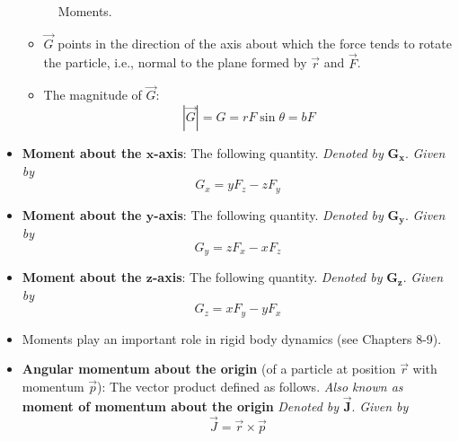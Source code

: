\documentclass[../notes.tex]{subfiles}
\begin{document}
\begin{itemize}
\begin{figure}[h!]
        \caption{Moments.}
        \label{fig:moments}
    \end{figure}
    \begin{itemize}
        \item $\vec{G}$ points in the direction of the axis about which the force tends to rotate the particle, i.e., normal to the plane formed by $\vec{r}$ and $\vec{F}$.
        \item The magnitude of $\vec{G}$:
        \begin{equation*}
            |\vec{G}| = G
            = rF\sin\theta
            = bF
        \end{equation*}
    \end{itemize}
    \item \textbf{Moment about the $\bm{x}$-axis}: The following quantity. \emph{Denoted by} $\bm{G_x}$. \emph{Given by}
    \begin{equation*}
        G_x = yF_z-zF_y
    \end{equation*}
    \item \textbf{Moment about the $\bm{y}$-axis}: The following quantity. \emph{Denoted by} $\bm{G_y}$. \emph{Given by}
    \begin{equation*}
        G_y = zF_x-xF_z
    \end{equation*}
    \item \textbf{Moment about the $\bm{z}$-axis}: The following quantity. \emph{Denoted by} $\bm{G_z}$. \emph{Given by}
    \begin{equation*}
        G_z = xF_y-yF_x
    \end{equation*}
    \item Moments play an important role in rigid body dynamics (see Chapters 8-9).
    \item \textbf{Angular momentum about the origin} (of a particle at position $\vec{r}$ with momentum $\vec{p}$): The vector product defined as follows. \emph{Also known as} \textbf{moment of momentum about the origin} \emph{Denoted by} $\bm{\vec{J}}$. \emph{Given by}
    \begin{equation*}
        \vec{J} = \vec{r}\times\vec{p}
    \end{equation*}

\end{itemize}
\end{document}
